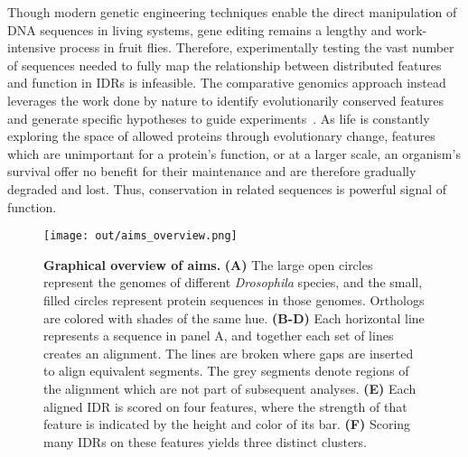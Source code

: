 Though modern genetic engineering techniques enable the direct manipulation of DNA sequences in living systems, gene editing remains a lengthy and work-intensive process in fruit flies. Therefore, experimentally testing the vast number of sequences needed to fully map the relationship between distributed features and function in IDRs is infeasible. The comparative genomics approach instead leverages the work done by nature to identify evolutionarily conserved features and generate specific hypotheses to guide experiments~\cite{Hardison2003}. As life is constantly exploring the space of allowed proteins through evolutionary change, features which are unimportant for a protein's function, or at a larger scale, an organism's survival offer no benefit for their maintenance and are therefore gradually degraded and lost. Thus, conservation in related sequences is powerful signal of function.

\begin{figure}[h!]
\texttt{[image: out/aims\_overview.png]}
\centering
\caption{\textbf{Graphical overview of aims.}
\textbf{(A)} The large open circles represent the genomes of different \textit{Drosophila} species, and the small, filled circles represent protein sequences in those genomes. Orthologs are colored with shades of the same hue. \textbf{(B-D)} Each horizontal line represents a sequence in panel A, and together each set of lines creates an alignment. The lines are broken where gaps are inserted to align equivalent segments. The grey segments denote regions of the alignment which are not part of subsequent analyses. \textbf{(E)} Each aligned IDR is scored on four features, where the strength of that feature is indicated by the height and color of its bar. \textbf{(F)} Scoring many IDRs on these features yields three distinct clusters.}
\label{fig:aims_overview}
\end{figure}

